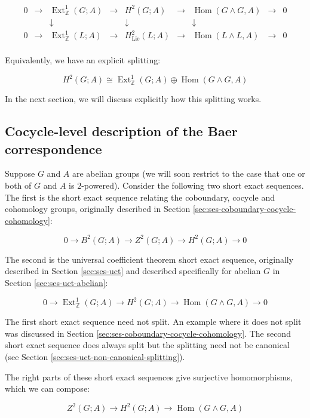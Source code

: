 \documentclass{ucetd}
\begin{document}
$$\begin{array}{ccccccccc}
  0 &\to &\operatorname{Ext}^1_{\mathbb{Z}}(G;A) &\to &H^2(G;A) &\to &\operatorname{Hom}(G \wedge G,A) &\to &0\\
  & & \downarrow & & \downarrow & & \downarrow & & \\
  0 &\to &\operatorname{Ext}^1_{\mathbb{Z}}(L;A) & \to & H^2_{\text{Lie}}(L;A) & \to & \operatorname{Hom}(L \wedge L, A) & \to & 0\\
\end{array}$$

Equivalently, we have an explicit splitting:

$$H^2(G;A) \cong \operatorname{Ext}^1_{\mathbb{Z}}(G;A) \oplus \operatorname{Hom}(G \wedge G,A)$$

In the next section, we will discuss explicitly how this splitting works.

\subsection{Cocycle-level description of the Baer correspondence}\label{sec:baer-correspondence-cocycle-level}

Suppose $G$ and $A$ are abelian groups (we will soon restrict to the
case that one or both of $G$ and $A$ is $2$-powered). Consider the
following two short exact sequences. The first is the short exact
sequence relating the coboundary, cocycle and cohomology groups,
originally described in Section
\ref{sec:ses-coboundary-cocycle-cohomology}:

$$0 \to B^2(G;A) \to Z^2(G;A) \to H^2(G;A) \to 0$$

The second is the universal coefficient theorem short exact sequence,
originally described in Section \ref{sec:ses-uct} and described
specifically for abelian $G$ in Section \ref{sec:ses-uct-abelian}:

$$0 \to \operatorname{Ext}^1_{\mathbb{Z}}(G;A) \to H^2(G;A) \to \operatorname{Hom}(G \wedge G,A) \to 0$$

The first short exact sequence need not split. An example where it
does not split was discussed in Section
\ref{sec:ses-coboundary-cocycle-cohomology}. The second short exact
sequence does always split but the splitting need not be canonical (see
Section \ref{sec:ses-uct-non-canonical-splitting}).

The right parts of these short exact sequences give surjective
homomorphisms, which we can compose:

$$Z^2(G;A) \to H^2(G;A) \to \operatorname{Hom}(G \wedge G,A)$$
\end{document}
